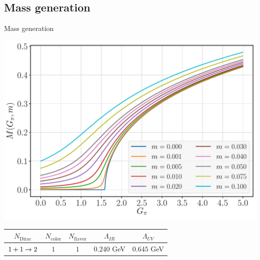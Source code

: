\documentclass[9pt, aspectratio=169]{beamer}
\begin{document}

\subsection{Mass generation}

\begin{frame}{Mass generation}

	\begin{center}
		\includegraphics[width=.5\paperwidth]{Figures/NJL1-model-solving/NJL1-dressed-mass-curves}
	\end{center}

	\vspace{-1em}

	\begin{table}[!bp]
	  \centering
	  \label{tab:NJL1-analytical-solution-parameters}
	  \begin{tabular}{ c c c c c }
	    \hline
	    $N_\text{Dirac}$ & $N_\text{color}$ & $N_\text{flavor}$ &
	    $\Lambda_{IR}$ & $\Lambda_{UV}$ \\
	    \hline
	    \hline
	    $1+1 \rightarrow 2$ & $1$ & $1$ & $0.240$ GeV & $0.645$ GeV \\
	    \hline
	  \end{tabular}
	\end{table}

\end{frame}


\end{document}
